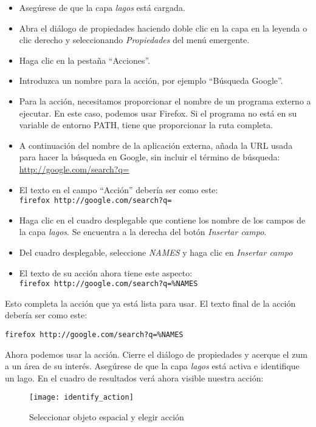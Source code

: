 \begin{itemize}
\item Asegúrese de que la capa \textsl{lagos} está cargada.
\item Abra el diálogo de propiedades haciendo doble clic en la capa en la leyenda o clic derecho y seleccionando \textsl{Propiedades} del menú emergente.
\item Haga clic en la pestaña ``Acciones''.
\item Introduzca un nombre para la acción, por ejemplo ``Búsqueda Google''.
\item Para la acción, necesitamos proporcionar el nombre de un programa externo a ejecutar. En este caso, podemos usar Firefox. Si el programa no está en su variable de entorno PATH, tiene que proporcionar la ruta completa.
\item A continuación del nombre de la aplicación externa, añada la URL usada para hacer la búsqueda en Google, sin incluir el término de búsqueda:
  \url{http://google.com/search?q=}
\item El texto en el campo ``Acción'' debería ser como este:\\
  \texttt{firefox http://google.com/search?q=}
\item Haga clic en el cuadro desplegable que contiene los nombre de los campos de la capa \textsl{lagos}. Se encuentra a la derecha del botón \textsl{Insertar campo}.
\item Del cuadro desplegable, seleccione \textsl{NAMES} y haga clic en \textsl{Insertar campo}
\item El texto de su acción ahora tiene este aspecto:\\ \texttt{firefox http://google.com/search?q=\%NAMES}
\end{itemize}
 
Esto completa la acción que ya está lista para usar. El texto final de la acción debería ser como este:

\begin{center}
\texttt{firefox http://google.com/search?q=\%NAMES}
\end{center}

Ahora podemos usar la acción. Cierre el diálogo de propiedades y acerque el zum a un área de su interés. Asegúrese de que la capa \textsl{lagos} está activa e identifique un lago. En el cuadro de resultados verá ahora visible nuestra acción:

\begin{figure}[H]
   \begin{center}
   \caption{Seleccionar objeto espacial y elegir acción}\label{fig:identify_action}\smallskip
   \texttt{[image: identify\_action]} 
\end{center}
\end{figure}

